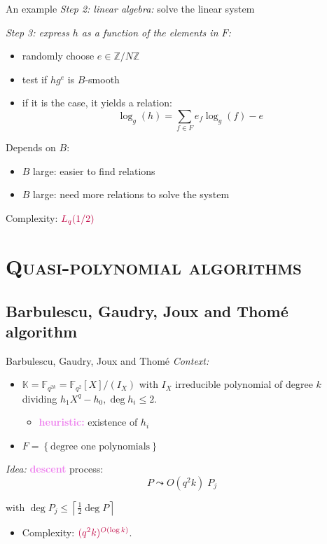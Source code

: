 \documentclass[xcolor=x11names,compress]{beamer}
\theoremstyle{break}
\theoremstyle{sc}
\theoremstyle{definition}
\theoremstyle{remark}
\begin{document}
\begin{frame}{An example}
  \emph{Step 2: linear algebra:} solve the linear system
  
  \emph{Step 3: express $h$ as a function of the elements in $F$:}
  \begin{itemize}
     \item randomly choose $e\in \mathbb{Z}/N\mathbb{Z}$
    \item test if $hg^e$ is $B$-smooth
    \item if it is the case, it yields a relation:
     \[
      \log_g(h) = \sum_{f\in F}e_f\log_g(f) - e
      \]
  \end{itemize}

 Depends on $B$:
  \begin{itemize}
    \item $B$ large: easier to find relations
    \item $B$ large: need more relations to solve the system
  \end{itemize}
  Complexity: $\textcolor{purple}{L_q(1/2)}$

\end{frame}

\section{\scshape Quasi-polynomial algorithms} 
\subsection{Barbulescu, Gaudry, Joux and Thomé algorithm}

\begin{frame}{Barbulescu, Gaudry, Joux and Thomé}
  \emph{Context:}
  \begin{itemize}
    \item $\mathbb{K}=\mathbb{F}_{q^{2k}}=\mathbb{F}_{q^2}[X]/(I_X)$ with $I_X$ irreducible
      polynomial of degree $k$ dividing $h_1X^q-h_0, \deg h_i\leq 2$.
      \begin{itemize}
        \item \textcolor{violet}{\textbf{heuristic:}} existence of $h_i$
      \end{itemize}
    \item $F=\left\{  \text{degree one polynomials}\right\}$ 
\end{itemize}
\emph{Idea:} \textcolor{violet}{\textbf{descent}} process:
  \[
    P \leadsto O(q^2k)\; P_j   
  \]
    
    with $\deg P_j \leq \left\lceil\frac{1}{2}\deg P\right\rceil$

    \begin{itemize}
      \item Complexity: $\textcolor{purple}{(q^2k)^{O(\log k)}}$.
    \end{itemize}

\end{frame}
\end{document}
